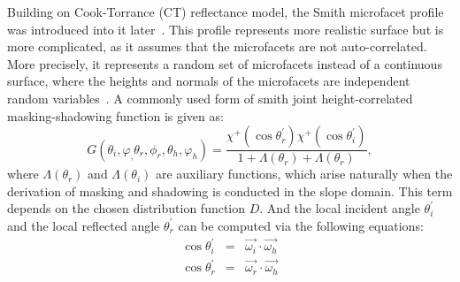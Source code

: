 \begin{itemize}
          Building on Cook-Torrance (CT) reflectance model, the Smith microfacet profile was introduced into it later~\cite{2014_Heitz}.
          This profile represents more realistic surface but is more complicated, as it assumes that the microfacets are not auto-correlated.
          More precisely, it represents a random set of microfacets instead of a continuous surface, where the heights and normals of the microfacets are independent random variables~\cite{2014_Heitz}.
          A commonly used form of smith joint height-correlated masking-shadowing function is given as:
          \begin{equation}
              \label{eq_g_smith}
              G(\theta_i, \varphi_, \theta_r, \phi_r, \theta_h, \varphi_h) = \frac{\chi^{+}(\cos\theta_r^\prime) \chi^{+}(\cos\theta_i^\prime)}{1 + \varLambda(\theta_r) + \varLambda(\theta_r)},
          \end{equation}
          where $\varLambda(\theta_r)$ and $\varLambda(\theta_i)$ are auxiliary functions, which arise naturally when the derivation of masking and shadowing is conducted in the slope domain.
          This term depends on the chosen distribution function $D$.
          And the local incident angle $\theta_i^\prime$ and the local reflected angle $\theta_r^\prime$ can be computed via the following equations:
          \begin{equation}
              \label{eq_local_theta_i_theta_r}
              \begin{array}{lll}
                  \cos \theta_i^\prime & = & \overrightarrow{\omega_i} \cdot \overrightarrow{\omega_h} \\
                  \cos \theta_r^\prime & = & \overrightarrow{\omega_r} \cdot \overrightarrow{\omega_h}
              \end{array}
          \end{equation}


\end{itemize}
